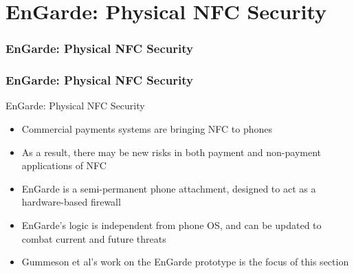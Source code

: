 \documentclass[unknownkeysallowed]{beamer}
\begin{document}
\section{EnGarde: Physical NFC Security}
\begin{frame}
\frametitle{EnGarde: Physical NFC Security}
\begin{center}\begin{minipage}{.9\textwidth}
\tableofcontents[currentsubsection, hideothersubsections, sectionstyle=show/shaded]
\end{minipage}\end{center}
\end{frame}
%

\begin{frame}
\frametitle{EnGarde: Physical NFC Security}
  \begin{center}
  \begin{minipage}{.9\textwidth}
  \begin{block}{EnGarde: Physical NFC Security}
    \begin{itemize}
      \item{Commercial payments systems are bringing NFC to phones}
      \pause
      \vspace{1mm}
      \item{As a result, there may be new risks in both payment and non-payment applications of NFC}
      \pause
      \vspace{1mm}
      \item{EnGarde is a semi-permanent phone attachment, designed to act as a hardware-based firewall}
      \pause
      \vspace{1mm}
      \item{EnGarde's logic is independent from phone OS, and can be updated to combat current and future threats}
      \pause
      \vspace{1mm}
      \item{Gummeson et al's work on the EnGarde prototype is the focus of this section}
    \end{itemize}
  \end{block}
  \end{minipage}
  \end{center}
\end{frame}
\end{document}
